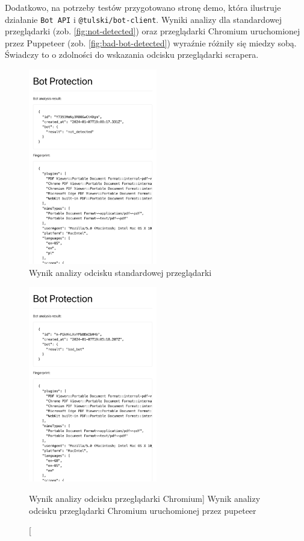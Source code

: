 Dodatkowo, na potrzeby testów przygotowano stronę demo, która ilustruje działanie \texttt{Bot API} i \texttt{@tulski/bot-client}.
Wyniki analizy dla standardowej przeglądarki (zob. \autoref{fig:not-detected})
oraz przeglądarki Chromium uruchomionej przez Puppeteer (zob. \autoref{fig:bad-bot-detected}) wyraźnie różniły się miedzy sobą.
Świadczy to o zdolności do wskazania odcisku przeglądarki scrapera.

\newpage
\begin{multicols}{2}
    \begin{figure}[H]
        \centering
        \includegraphics[width=0.5\textwidth]{img/bot-protection-not-detected}
        \caption{Wynik analizy odcisku standardowej przeglądarki}
        \label{fig:not-detected}
    \end{figure}
    \columnbreak
    \begin{figure}[H]
        \centering
        \includegraphics[width=0.5\textwidth]{img/bot-protection-bad-bot}
        \caption
            [Wynik analizy odcisku przeglądarki Chromium]
            {Wynik analizy odcisku przeglądarki Chromium uruchomionej przez pupeteer}
        \label{fig:bad-bot-detected}
    \end{figure}
\end{multicols}

